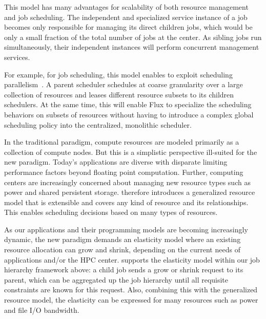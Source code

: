 This model has many advantages for scalability of both
resource management and job scheduling. 
The independent and specialized \flux service instance
of a job becomes only responsible for managing its direct
children jobs, which would be only a small fraction of
the total number of jobs at the center. 
As sibling jobs run simultaneously, their independent
\flux instances will perform concurrent management services.

For example, for job scheduling, this model enables \flux
to exploit scheduling parallelism~\cite{Omega,Mesos}.
A parent scheduler schedules at coarse granularity 
over a large collection of resources and leases different resource subsets 
to its children schedulers. 
At the same time, this will enable Flux to specialize the scheduling behaviors 
on subsets of resources without having to introduce a
complex global scheduling policy into the centralized, monolithic scheduler. 


 In the traditional 
paradigm, compute resources are modeled primarily 
as a collection of compute nodes. But this is a simplistic perspective 
ill-suited for the new paradigm. Today's applications 
are diverse with disparate limiting performance factors 
beyond floating point computation. 
Further, computing centers are increasingly concerned 
about managing new resource types such as power 
and shared persistent storage. \flux therefore introduces a generalized resource
model that is extensible and covers any kind of resource and its relationships. This enables scheduling
decisions based on many types of resources.


 As our 
applications and their programming models are becoming 
increasingly dynamic, the new paradigm demands 
an elasticity model where an existing resource allocation 
can grow and shrink, depending on the current needs 
of applications and/or the HPC center. 
\flux supports the elasticity model within our job hierarchy 
framework above: a child job sends a grow or shrink request 
to its parent, which can be aggregated up the job hierarchy 
until all requisite constraints are known for this request. 
Also, combining this with the generalized resource model, 
the elasticity can be expressed for many resources such
as power and file I/O bandwidth. 

